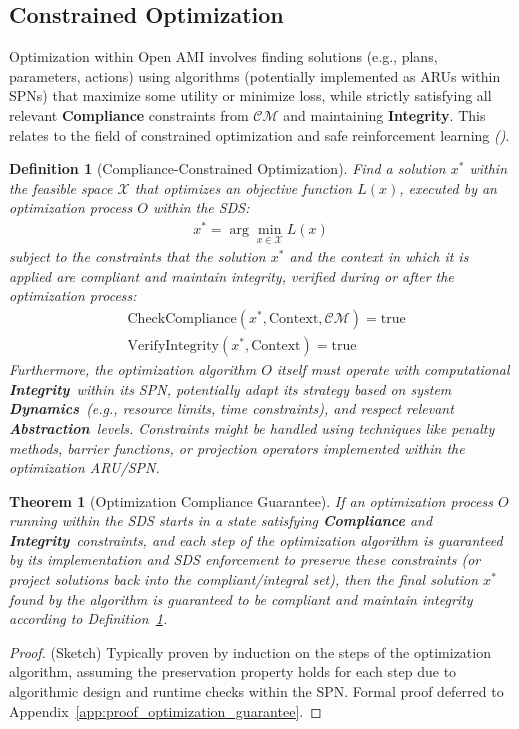 \documentclass[12pt,a4paper]{report}
\renewcommand{\citep}[1]{\textit{\scriptsize{(\cite{#1})}}}
\newtheorem{definition}{Definition}[section]
\newtheorem{theorem}{Theorem}[section]
\newcommand{\Integrity}{\textbf{Integrity}}
\newcommand{\Abstraction}{\textbf{Abstraction}}
\newcommand{\Dynamics}{\textbf{Dynamics}}
\begin{document}
	\subsection{Constrained Optimization}
	\label{sec:2-6-2}
	
	Optimization within Open AMI involves finding solutions (e.g., plans, parameters, actions) using algorithms (potentially implemented as ARUs within SPNs) that maximize some utility or minimize loss, while strictly satisfying all relevant \textbf{Compliance} constraints from $\mathcal{CM}$ and maintaining \Integrity. This relates to the field of constrained optimization and safe reinforcement learning \citep{Constraint_RL_Survey_2024}.
	
	\begin{definition}[Compliance-Constrained Optimization]
		\label{def:compliant_optimization}
		Find a solution $x^*$ within the feasible space $\mathcal{X}$ that optimizes an objective function $L(x)$, executed by an optimization process $O$ within the SDS:
		\begin{align}
			x^* = \arg\min_{x \in \mathcal{X}} L(x)
		\end{align}
		subject to the constraints that the solution $x^*$ and the context in which it is applied are compliant and maintain integrity, verified during or after the optimization process:
		\begin{align}
			&\text{CheckCompliance}(x^*, \text{Context}, \mathcal{CM}) = \text{true} \label{eq:opt_comp} \\
			&\text{VerifyIntegrity}(x^*, \text{Context}) = \text{true} \label{eq:opt_int}
		\end{align}
		Furthermore, the optimization algorithm $O$ itself must operate with computational \Integrity\ within its SPN, potentially adapt its strategy based on system \Dynamics\ (e.g., resource limits, time constraints), and respect relevant \Abstraction\ levels. Constraints might be handled using techniques like penalty methods, barrier functions, or projection operators implemented within the optimization ARU/SPN.
	\end{definition}
	
	\begin{theorem}[Optimization Compliance Guarantee]
		\label{thm:optimization_guarantee}
		If an optimization process $O$ running within the SDS starts in a state satisfying \textbf{Compliance} and \Integrity\ constraints, and each step of the optimization algorithm is guaranteed by its implementation and SDS enforcement to preserve these constraints (or project solutions back into the compliant/integral set), then the final solution $x^*$ found by the algorithm is guaranteed to be compliant and maintain integrity according to Definition~\ref{def:compliant_optimization}.
	\end{theorem}
	\begin{proof}
		(Sketch) Typically proven by induction on the steps of the optimization algorithm, assuming the preservation property holds for each step due to algorithmic design and runtime checks within the SPN. Formal proof deferred to Appendix~\ref{app:proof_optimization_guarantee}.
	\end{proof}
	
\end{document}
